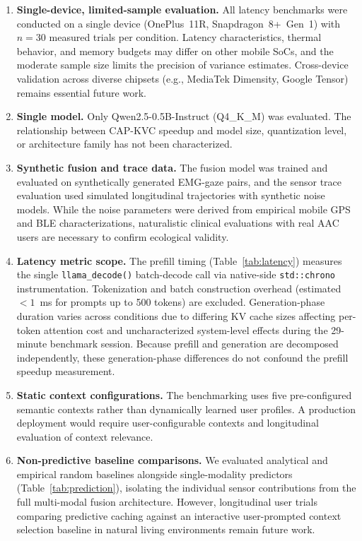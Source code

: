 \documentclass[journal]{IEEEtran}
\begin{document}
\begin{enumerate}
    \item \textbf{Single-device, limited-sample evaluation.} All latency benchmarks were conducted on a single device (OnePlus~11R, Snapdragon~8+~Gen~1) with $n = 30$ measured trials per condition. Latency characteristics, thermal behavior, and memory budgets may differ on other mobile SoCs, and the moderate sample size limits the precision of variance estimates. Cross-device validation across diverse chipsets (e.g., MediaTek Dimensity, Google Tensor) remains essential future work.

    \item \textbf{Single model.} Only Qwen2.5-0.5B-Instruct (Q4\_K\_M) was evaluated. The relationship between CAP-KVC speedup and model size, quantization level, or architecture family has not been characterized.

    \item \textbf{Synthetic fusion and trace data.} The fusion model was trained and evaluated on synthetically generated EMG-gaze pairs, and the sensor trace evaluation used simulated longitudinal trajectories with synthetic noise models. While the noise parameters were derived from empirical mobile GPS and BLE characterizations, naturalistic clinical evaluations with real AAC users are necessary to confirm ecological validity.

    \item \textbf{Latency metric scope.} The prefill timing (Table~\ref{tab:latency}) measures the single \texttt{llama\_decode()} batch-decode call via native-side \texttt{std::chrono} instrumentation. Tokenization and batch construction overhead (estimated $< 1$~ms for prompts up to 500 tokens) are excluded. Generation-phase duration varies across conditions due to differing KV cache sizes affecting per-token attention cost and uncharacterized system-level effects during the 29-minute benchmark session. Because prefill and generation are decomposed independently, these generation-phase differences do not confound the prefill speedup measurement.

    \item \textbf{Static context configurations.} The benchmarking uses five pre-configured semantic contexts rather than dynamically learned user profiles. A production deployment would require user-configurable contexts and longitudinal evaluation of context relevance.

    \item \textbf{Non-predictive baseline comparisons.} We evaluated analytical and empirical random baselines alongside single-modality predictors (Table~\ref{tab:prediction}), isolating the individual sensor contributions from the full multi-modal fusion architecture. However, longitudinal user trials comparing predictive caching against an interactive user-prompted context selection baseline in natural living environments remain future work.


\end{enumerate}
\end{document}

